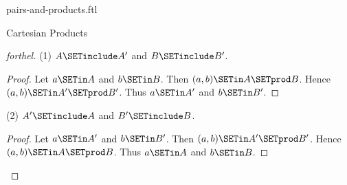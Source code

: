\documentclass{naproche-library}
\begin{document}
\begin{smodule}[title=Ordered Pairs and Cartesian Products]{pairs-and-products.ftl}
\begin{sfragment}{Cartesian Products}
\begin{proof}[forthel]
    (1) $A \SETinclude A'$ and $B \SETinclude B'$.
    \begin{proof}
      Let $a \SETin A$ and $b \SETin B$.
      Then $(a,b) \SETin A \SETprod B$.
      Hence $(a,b) \SETin A' \SETprod B'$.
      Thus $a \SETin A'$ and $b \SETin B'$.
    \end{proof}

    (2) $A' \SETinclude A$ and $B' \SETinclude B$.
    \begin{proof}
      Let $a \SETin A'$ and $b \SETin B'$.
      Then $(a,b) \SETin A' \SETprod B'$.
      Hence $(a,b) \SETin A \SETprod B$.
      Thus $a \SETin A$ and $b \SETin B$.
    \end{proof}
  \end{proof}
\end{sfragment}
\end{smodule}
\end{document}
